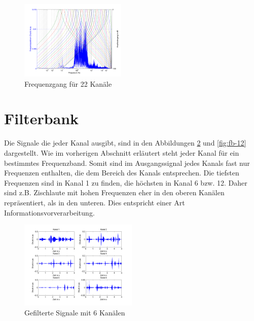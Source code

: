 \documentclass[conference]{IEEEtran}
\begin{document}
\begin{figure}[h]
	\vspace{-5pt}
	\centering
	\includegraphics[width=0.45\textwidth]{img/freq_gang_22.png}
	\vspace{-10pt}
	\caption{Frequenzgang für 22 Kanäle}
	\vspace{-20pt}
	\label{fig:freq-gang-22}
\end{figure}

\section{Filterbank}
Die Signale die jeder Kanal ausgibt, sind in den Abbildungen \ref{fig:fb-6} und \ref{fig:fb-12} dargestellt. Wie im vorherigen Abschnitt erläutert steht jeder Kanal für ein bestimmtes Frequenzband. Somit sind im Ausgangssignal jedes Kanals fast nur Frequenzen enthalten, die dem Bereich des Kanals entsprechen. Die tiefsten Frequenzen sind in Kanal 1 zu finden, die höchsten in Kanal 6 bzw. 12. Daher sind z.B. Zischlaute mit hohen Frequenzen eher in den oberen Kanälen repräsentiert, als in den unteren. Dies entspricht einer Art Informationsvorverarbeitung. 
\begin{figure}[h]
	\vspace{-5pt}
	\centering
	\includegraphics[width=0.5\textwidth]{img/fb_6.png}
	\vspace{-20pt}
	\caption{Gefilterte Signale mit 6 Kanälen}
	\vspace{-20pt}
	\label{fig:fb-6}
\end{figure}
\end{document}

